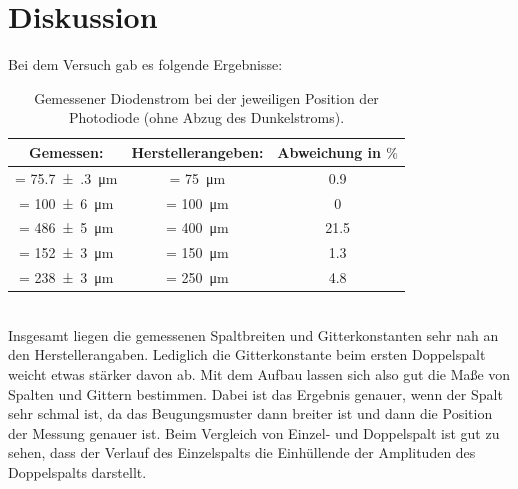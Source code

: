 \documentclass[
  bibliography=totoc,     %
  captions=tableheading,  %
  titlepage=firstiscover, %
]{scrartcl}
\begin{document}
\section{Diskussion}
\label{sec:diskussion}
Bei dem Versuch gab es folgende Ergebnisse:
\begin{table}
  \centering
  \caption{Gemessener Diodenstrom bei der jeweiligen Position der Photodiode (ohne Abzug des Dunkelstroms).}
  \label{tab:messwerte1}
  \begin{tabular}{S S[table-format=3.0] S[table-format=2.1]}
    \toprule
    {Gemessen:} & {Herstellerangeben:} & {Abweichung in $\si{\percent}$} \\
    \midrule
     = \SI{75.7(3)}{\micro\meter} &  = \SI{75}{\micro\meter} & 0.9\\
     = \SI{100(6)}{\micro\meter} &  = \SI{100}{\micro\meter} & 0\\
     = \SI{486(5)}{\micro\meter} &  = \SI{400}{\micro\meter} & 21.5\\
     = \SI{152(3)}{\micro\meter} &  = \SI{150}{\micro\meter} & 1.3\\
     = \SI{238(3)}{\micro\meter} &  = \SI{250}{\micro\meter} & 4.8\\
    \bottomrule
  \end{tabular}
\end{table}\\
Insgesamt liegen die gemessenen Spaltbreiten und Gitterkonstanten sehr nah an den Herstellerangaben. Lediglich die Gitterkonstante
beim ersten Doppelspalt weicht etwas stärker davon ab.
Mit dem Aufbau lassen sich also gut die Maße von Spalten und Gittern bestimmen.
Dabei ist das Ergebnis genauer, wenn der Spalt sehr schmal ist, da das Beugungsmuster
dann breiter ist und dann die Position der Messung genauer ist.
Beim Vergleich von Einzel- und Doppelspalt ist gut zu sehen, dass der Verlauf
des Einzelspalts die Einhüllende der Amplituden des Doppelspalts darstellt.
\nocite{*}
\printbibliography
\end{document}
